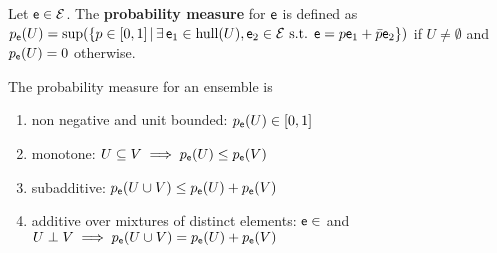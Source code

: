 \begin{defn}
	Let $\mathsf{e} \in \mathcal{E}$. The \textbf{probability measure} for $\mathsf{e}$ is defined as $p_{\mathsf{e}}(U) = \sup(\{ p \in [0,1] \, | \, \exists \, \mathsf{e}_1 \in \mathrm{hull}(U), \mathsf{e}_2 \in \mathcal{E} \text{ s.t. }  \mathsf{e} = p \mathsf{e}_1 + \bar{p} \mathsf{e}_2 \})$ if $U \neq \emptyset$ and $p_{\mathsf{e}}(U) = 0$ otherwise.
\end{defn}

\begin{prop}
	The probability measure for an ensemble is
	\begin{enumerate}
		\item non negative and unit bounded: $p_{\mathsf{e}}(U) \in [0,1]$
		\item monotone: $U \subseteq V \implies p_{\mathsf{e}}(U) \leq p_{\mathsf{e}}(V)$
		\item subadditive: $p_{\mathsf{e}}(U \cup V) \leq p_{\mathsf{e}}(U) + p_{\mathsf{e}}(V)$
		\item additive over mixtures of distinct elements: $\mathsf{e} \in $ and  $U \perp V \implies p_{\mathsf{e}}(U \cup V) = p_{\mathsf{e}}(U) + p_{\mathsf{e}}(V)$ 
	\end{enumerate}
\end{prop}

